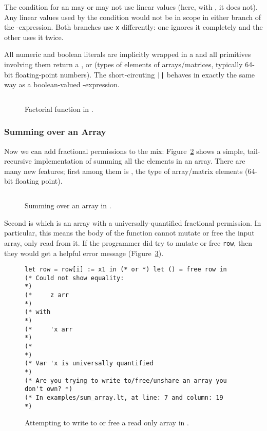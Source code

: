 The condition for an  may or may not use linear values (here, with
, it does not). Any linear values used by the condition
would not be in scope in either branch of the -expression.  Both
branches use \texttt{x} differently: one ignores it completely and the other
uses it twice.

All numeric and boolean literals are implicitly wrapped in a  and
all primitives involving them return a ,  or
 (types of elements of arrays/matrices, typically 64-bit
floating-point numbers). The short-circuting \texttt{||} behaves in exactly the
same way as a boolean-valued -expression.

\begin{figure}[t]
    \centering
    \inputminted[fontsize=\small, linenos]{ocaml}{../../examples/factorial.lt}
    \caption{Factorial function in \lang.}\label{fig:lang_factorial}
\end{figure}

\subsubsection{Summing over an Array}

Now we can add fractional permissions to the mix:
Figure~\ref{fig:lang_sumarray} shows a simple, tail-recursive implementation of
summing all the elements in an array. There are many new features; first among
them is , the type of array/matrix elements (64-bit floating
point).

\begin{figure}[t]
    \centering
    \inputminted[fontsize=\small]{ocaml}{../../examples/sum_array.lt}
    \caption{Summing over an array in \lang.}\label{fig:lang_sumarray}
\end{figure}

Second is  which is an array with a
universally-quantified fractional permission. In particular, this means the
body of the function cannot mutate or free the input array, only read from it.
If the programmer did try to mutate or free \texttt{row}, then they would get a
helpful error message (Figure~\ref{fig:lang_errormsg}).

\begin{figure}[t]
    \centering
    \begin{verbatim}
let row = row[i] := x1 in (* or *) let () = free row in
(* Could not show equality:                                        *)
(*     z arr                                                       *)
(* with                                                            *)
(*     'x arr                                                      *)
(*                                                                 *)
(* Var 'x is universally quantified                                *)
(* Are you trying to write to/free/unshare an array you don't own? *)
(* In examples/sum_array.lt, at line: 7 and column: 19        *)
    \end{verbatim}
    \caption{Attempting to write to or free a read only array in
    \lang.}\label{fig:lang_errormsg}
\end{figure}

